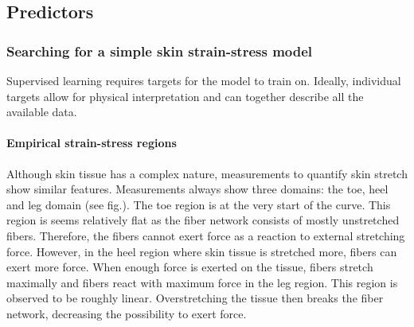 \subsection{Predictors}\label{sec:skin_predictors}


\subsubsection{Searching for a simple skin strain-stress model}

Supervised learning requires targets for the model to train on.
Ideally, individual targets allow for physical interpretation and can together describe all the available data.

\paragraph{Empirical strain-stress regions}
Although skin tissue has a complex nature, measurements to quantify skin stretch show similar features.
Measurements always show three domains: the toe, heel and leg domain (see fig.).
The toe region is at the very start of the curve.
This region is seems relatively flat as the fiber network consists of mostly unstretched fibers.
Therefore, the fibers cannot exert force as a reaction to external stretching force.
However, in the heel region where skin tissue is stretched more, fibers can exert more force.
When enough force is exerted on the tissue, fibers stretch maximally and fibers react with maximum force in the leg region.
This region is observed to be roughly linear.
Overstretching the tissue then breaks the fiber network, decreasing the possibility to exert force.

